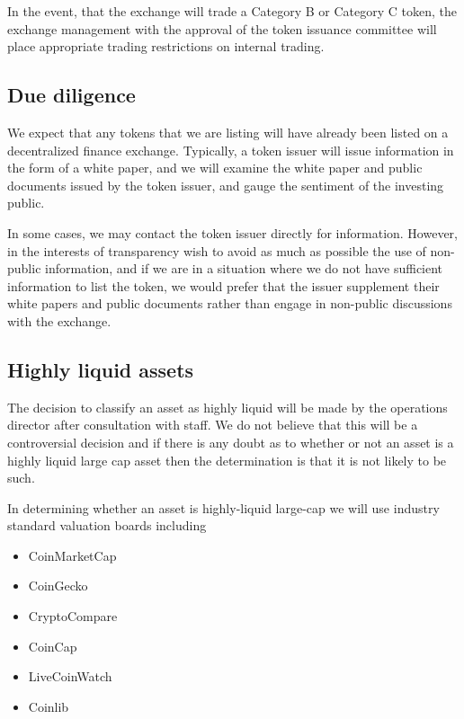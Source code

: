 In the event, that the exchange will trade a Category B or Category C
token, the exchange management with the approval of the token issuance
committee will place appropriate trading restrictions on internal
trading.


\subsection{Due diligence}

We expect that any tokens that we are listing will have already been
listed on a decentralized finance exchange.  Typically, a token issuer
will issue information in the form of a white paper, and we will
examine the white paper and public documents issued by the token
issuer, and gauge the sentiment of the investing public.

In some cases, we may contact the token issuer directly for
information.  However, in the interests of transparency wish to avoid
as much as possible the use of non-public information, and if we are
in a situation where we do not have sufficient information to list the
token, we would prefer that the issuer supplement their white papers
and public documents rather than engage in non-public discussions with
the exchange.

\subsection{Highly liquid assets}

The decision to classify an asset as highly liquid will be made by the
operations director after consultation with staff.  We do not believe
that this will be a controversial decision and if there is any doubt
as to whether or not an asset is a highly liquid large cap asset then
the determination is that it is not likely to be such.

In determining whether an asset is highly-liquid large-cap we will
use industry standard valuation boards including
\begin{itemize}
\item CoinMarketCap
\item CoinGecko
\item CryptoCompare
\item CoinCap
\item LiveCoinWatch
\item Coinlib
\end{itemize}

